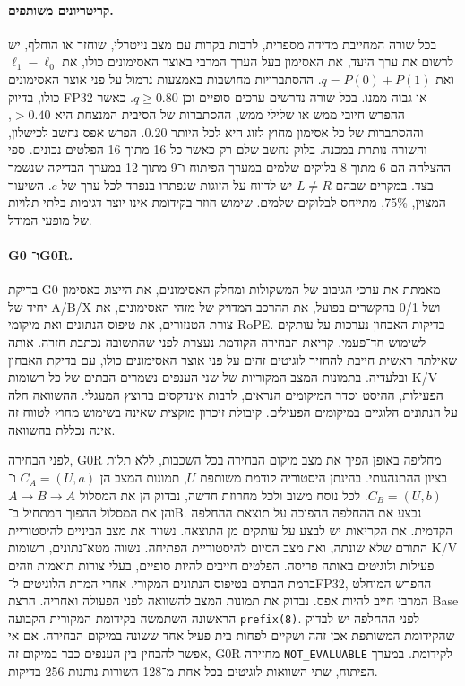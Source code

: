 \documentclass[11pt,a4paper]{article}
\DeclareRobustCommand{\textenglish}[1]{\foreignlanguage{english}{#1}}
\theoremstyle{definition}
\begin{document}
\paragraph{קריטריונים משותפים.}
בכל שורה המחייבת מדידה מספרית, לרבות בקרות עם מצב נייטרלי, שוחזר או הוחלף, יש לרשום את ערך היעד, את האסימון בעל הערך המרבי באוצר האסימונים כולו, את $\ell_1-\ell_0$ ואת $q=P(0)+P(1)$. ההסתברויות מחושבות באמצעות נרמול על פני אוצר האסימונים כולו, בדיוק \textenglish{FP32} או גבוה ממנו. בכל שורה נדרשים ערכים סופיים וכן $q\ge 0.80$. כאשר ההפרש חיובי ממש או שלילי ממש, ההסתברות של הסיבית המנצחת היא $>0.40$, וההסתברות של כל אסימון מחוץ לזוג היא לכל היותר $0.20$. הפרש אפס נחשב לכישלון, והשורה נותרת במכנה. בלוק נחשב שלם רק כאשר כל 16 מתוך 16 הפלטים נכונים. ספי ההצלחה הם 6 מתוך 8 בלוקים שלמים במערך הפיתוח ו־9 מתוך 12 במערך הבדיקה שנשמר בצד. במקרים שבהם $L\ne R$ יש לדווח על הזוגות שנפתרו בנפרד לכל ערך של $e$. השיעור המצוין, 75\%, מתייחס לבלוקים שלמים. שימוש חוזר בקידומת אינו יוצר דגימות בלתי תלויות של מופעי המודל.

\paragraph{\textenglish{G0} ו־\textenglish{G0R}.}
בדיקת \textenglish{G0} מאמתת את ערכי הגיבוב של המשקולות ומחלק האסימונים, את הייצוג באסימון יחיד של \textenglish{A/B/X} ושל \textenglish{0/1} בהקשרים בפועל, את ההרכב המדויק של מזהי האסימונים, את צורת הטנזורים, את טיפוס הנתונים ואת מיקומי \textenglish{RoPE}. בדיקות האבחון נערכות על עותקים לשימוש חד־פעמי. קריאת הבחירה הקודמת נעצרת לפני שהתשובה נכתבת חזרה. אותה שאילתה ראשית חייבת להחזיר לוגיטים זהים על פני אוצר האסימונים כולו, עם בדיקת האבחון ובלעדיה. בתמונות המצב המקוריות של שני הענפים נשמרים הבתים של כל רשומות \textenglish{K/V} הפעילות, ההיסט וסדר המיקומים הנראים, לרבות אינדקסים בחוצץ המעגלי. ההשוואה חלה על הנתונים הלוגיים במיקומים הפעילים. קיבולת זיכרון מוקצית שאינה בשימוש מחוץ לטווח זה אינה נכללת בהשוואה.

לפני הבחירה, \textenglish{G0R} מחליפה באופן הפיך את מצב מיקום הבחירה בכל השכבות, ללא תלות בציון ההתנהגותי. בהינתן היסטוריה קודמת משותפת $U$, תמונות המצב הן $C_A=(U,a)$ ו־$C_B=(U,b)$. לכל נוסח משוב ולכל מחרוזת חדשה, נבדוק הן את המסלול $A\to B\to A$ והן את המסלול ההפוך המתחיל ב־\textenglish{B}. נבצע את ההחלפה ההפוכה על תוצאת ההחלפה הקדמית. את הקריאות יש לבצע על עותקים מן התוצאה. נשווה את מצב הביניים להיסטוריית התורם שלא שונתה, ואת מצב הסיום להיסטוריית הפתיחה. נשווה מטא־נתונים, רשומות \textenglish{K/V} פעילות ולוגיטים באותה פריסה. הפלטים חייבים להיות סופיים, בעלי צורות תואמות וזהים ברמת הבתים בטיפוס הנתונים המקורי. אחרי המרת הלוגיטים ל־\textenglish{FP32}, ההפרש המוחלט המרבי חייב להיות אפס. נבדוק את תמונות המצב להשוואה לפני הפעולה ואחריה. הרצת \textenglish{Base} הראשונה השתמשה בקידומת המקורית הקבועה \textenglish{\texttt{prefix(8)}}. לפני ההחלפה יש לבדוק שהקידומת המשותפת אכן זהה ושקיים לפחות בית פעיל אחד ששונה במיקום הבחירה. אם אי אפשר להבחין בין הענפים כבר במיקום זה, \textenglish{G0R} מחזירה \textenglish{\texttt{NOT\_EVALUABLE}} לקידומת. במערך הפיתוח, שתי השוואות לוגיטים בכל אחת מ־128 השורות נותנות 256 בדיקות.
\end{document}
